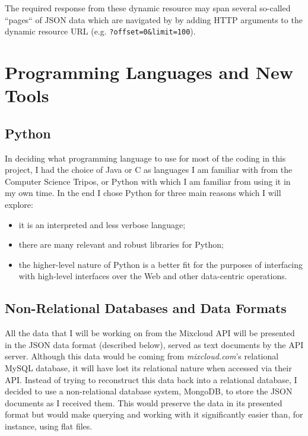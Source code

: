 \documentclass[a4paper,12pt,twoside,notitlepage]{report}
\def\mixurl{\emph{mixcloud.com}}
\newcommand{\todo}[1]{\ifdraft{\textsf{\color{red} TODO: #1}}\fi}
\begin{document}
The required response from these dynamic resource may span several
so-called ``pages`` of JSON data which are navigated by by adding HTTP
arguments to the dynamic resource URL (e.g. \texttt{?offset=0\&limit=100}).


\section{Programming Languages and New Tools}

\subsection{Python}

In deciding what programming language to use for most of the coding in this
project, I had the choice of Java or C as languages I am familiar with from the
Computer Science Tripos, or Python with which I am familiar from using it in my
own time. In the end I chose Python for three main reasons which I will explore:
\begin{itemize}
 \item it is an interpreted and less verbose language; 
 \item there are many relevant and robust libraries for Python; 
 \item the higher-level nature of Python is a better fit for the purposes
of interfacing with high-level interfaces over the Web and other data-centric
operations.
\end{itemize}

\todo{expand on above}

\subsection{Non-Relational Databases and Data Formats}
\label{subsec:nonrel}

All the data that I will be working on from the Mixcloud API will be presented
in the JSON data format (described below), served as text documents by the API
server. Although this data would be coming from \mixurl's relational MySQL
database, it will have lost its relational nature when accessed via their API.
Instead of trying to reconstruct this data back into a relational database, I
decided to use a non-relational database system, MongoDB, to store the JSON
documents as I received them. This would preserve the data in its presented
format but would make querying and working with it significantly easier than,
for instance, using flat files.
\end{document}
